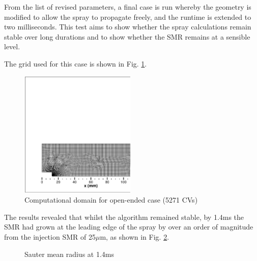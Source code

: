 \documentclass[a4paper,10pt]{article}
\begin{document}
From the list of revised parameters, a final case is run whereby the geometry is modified to allow the spray to propagate freely, and the runtime is extended to two milliseconds. This test aims to show whether the spray calculations remain stable over long durations and to show whether the SMR remains at a sensible level.

The grid used for this case is shown in Fig. \ref{fig:open_grid}.
\begin{figure}[H]
\centering
\includegraphics[width=0.49\textwidth]{grid_open.eps}
\caption{Computational domain for open-ended case (5271 CVs)}
\label{fig:open_grid}
\end{figure}
The results revealed that whilst the algorithm remained stable, by 1.4ms the SMR had grown at the leading edge of the spray by over an order of magnitude from the injection SMR of 25$\mu$m, as shown in Fig. \ref{fig:open_smr}.
\begin{figure}[H]
\centering
{}
\caption{Sauter mean radius at 1.4ms}
\label{fig:open_smr}
\end{figure}
\end{document}
